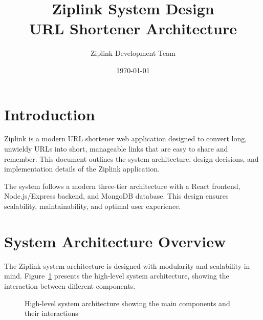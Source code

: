 \documentclass[11pt,a4paper]{article}
\title{Ziplink System Design \\ URL Shortener Architecture}
\author{Ziplink Development Team}
\date{\today}
\begin{document}
\maketitle
\tableofcontents
\newpage

\section{Introduction}

Ziplink is a modern URL shortener web application designed to convert long, unwieldy URLs into short, manageable links that are easy to share and remember. This document outlines the system architecture, design decisions, and implementation details of the Ziplink application.

The system follows a modern three-tier architecture with a React frontend, Node.js/Express backend, and MongoDB database. This design ensures scalability, maintainability, and optimal user experience.

\section{System Architecture Overview}

The Ziplink system architecture is designed with modularity and scalability in mind. Figure~\ref{fig:system-overview} presents the high-level system architecture, showing the interaction between different components.

\begin{figure}[!ht]
\centering
{}
\caption{High-level system architecture showing the main components and their interactions}
\label{fig:system-overview}
\end{figure}
\end{document}

